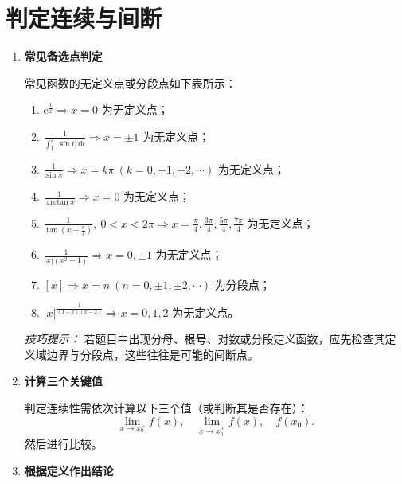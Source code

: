 \section{判定连续与间断}

\begin{enumerate}
    \item \textbf{常见备选点判定}

          常见函数的无定义点或分段点如下表所示：

          \begin{enumerate}
              \item $\displaystyle \mathrm{e}^{\frac{1}{x}} \Rightarrow x=0$ 为无定义点；
              \item $\displaystyle \frac{1}{\int_{1}^{x}|\sin t|\,\mathrm{d}t} \Rightarrow x=\pm1$ 为无定义点；
              \item $\displaystyle \frac{1}{\sin x} \Rightarrow x=k\pi \ (k=0,\pm1,\pm2,\cdots)$ 为无定义点；
              \item $\displaystyle \frac{1}{\arctan x} \Rightarrow x=0$ 为无定义点；
              \item $\displaystyle \frac{1}{\tan\!\left(x-\frac{\pi}{4}\right)},\ 0<x<2\pi
                        \Rightarrow x=\frac{\pi}{4},\frac{3\pi}{4},\frac{5\pi}{4},\frac{7\pi}{4}$ 为无定义点；
              \item $\displaystyle \frac{1}{|x|(x^2-1)} \Rightarrow x=0,\pm1$ 为无定义点；
              \item $[x] \Rightarrow x=n\ (n=0,\pm1,\pm2,\cdots)$ 为分段点；
              \item $\displaystyle |x|^{\frac{1}{(1-x)(x-2)}} \Rightarrow x=0,1,2$ 为无定义点。
          \end{enumerate}

          \vspace{0.5em}
          \textit{技巧提示：}
          若题目中出现分母、根号、对数或分段定义函数，应先检查其定义域边界与分段点，这些往往是可能的间断点。

    \item \textbf{计算三个关键值}

          判定连续性需依次计算以下三个值（或判断其是否存在）：
          \[
              \lim_{x\to x_0^-}f(x), \quad
              \lim_{x\to x_0^+}f(x), \quad
              f(x_0).
          \]
          然后进行比较。

    \item \textbf{根据定义作出结论}


\end{enumerate}
